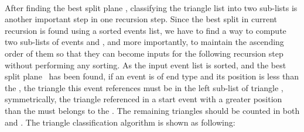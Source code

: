 \paragraph{} 
After finding the best split plane \mybestsplitplane, classifying the triangle list into two sub-lists is another important step in one recursion step. Since the best split in current recursion is found using a sorted events list, we have to find a way to compute two sub-lists of events \myeventlistleft and \myeventlistright, and more importantly, to maintain the ascending order of them so that they can become inputs for the following recursion step without performing any sorting. As the input event list \myeventlist is sorted, and the best split plane \mybestsplitplane\ has been found, if an event is of end type and its position is less than the \mybestsplitplane, the triangle this event references must be in the left sub-list of triangle \mylefttrilist, symmetrically, the triangle referenced in a start event with a greater position than the \mybestsplitplane must belongs to the \myrighttrilist. The remaining triangles should be counted in both \mylefttrilist and \myrighttrilist. The triangle classification algorithm is shown as following: 


